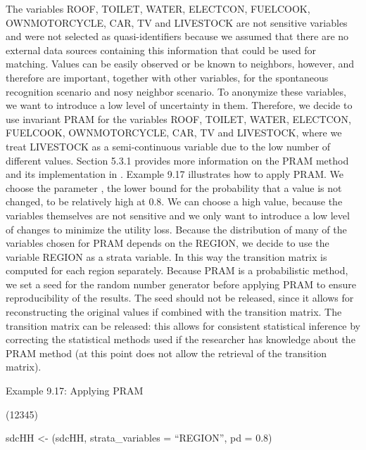 \documentclass[letterpaper,10pt,english]{sphinxmanual}
\begin{document}
The variables ROOF, TOILET, WATER, ELECTCON, FUELCOOK, OWNMOTORCYCLE,
CAR, TV and LIVESTOCK are not sensitive variables and were not selected
as quasi-identifiers because we assumed that there are no external data
sources containing this information that could be used for matching.
Values can be easily observed or be known to neighbors, however, and
therefore are important, together with other variables, for the
spontaneous recognition scenario and nosy neighbor scenario. To
anonymize these variables, we want to introduce a low level of
uncertainty in them. Therefore, we decide to use invariant PRAM for the
variables ROOF, TOILET, WATER, ELECTCON, FUELCOOK, OWNMOTORCYCLE, CAR,
TV and LIVESTOCK, where we treat LIVESTOCK as a semi-continuous variable
due to the low number of different values. Section 5.3.1 provides more
information on the PRAM method and its implementation in .
Example 9.17 illustrates how to apply PRAM. We choose the parameter
, the lower bound for the probability that a value is not changed,
to be relatively high at 0.8. We can choose a high value, because the
variables themselves are not sensitive and we only want to introduce a
low level of changes to minimize the utility loss. Because the
distribution of many of the variables chosen for PRAM depends on the
REGION, we decide to use the variable REGION as a strata variable. In
this way the transition matrix is computed for each region separately.
Because PRAM is a probabilistic method, we set a seed for the random
number generator before applying PRAM to ensure reproducibility of the
results.  The seed should not be released, since it allows for
reconstructing the original values if combined with the transition
matrix. The transition matrix can be released: this allows for
consistent statistical inference by correcting the statistical methods
used if the researcher has knowledge about the PRAM method (at this
point  does not allow the retrieval of the transition matrix).

Example 9.17: Applying PRAM

\begin{DUlineblock}{0em}
\item[] 
\item[] (12345)
\item[] sdcHH \textless{}- (sdcHH, strata\_variables = “REGION”, pd = 0.8)
\end{DUlineblock}
\end{document}
